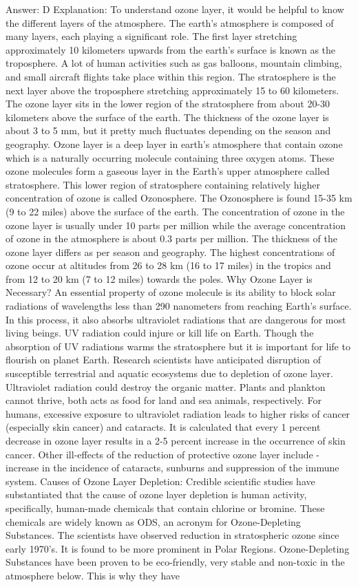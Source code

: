Answer: D
Explanation: To understand ozone layer, it would be helpful to know the different layers of the atmosphere. The earth’s atmosphere is composed of many layers, each playing a significant role. The first layer stretching approximately 10 kilometers upwards from the earth’s surface is known as the troposphere. A lot of human activities such as gas balloons, mountain climbing, and small aircraft flights take place within this region. The stratosphere is the next layer above the troposphere stretching approximately 15 to 60 kilometers. The ozone layer sits in the lower region of the stratosphere from about 20-30 kilometers above the surface of the earth. The thickness of the ozone layer is about 3 to 5 mm, but it pretty much fluctuates depending on the season and geography. Ozone layer is a deep layer in earth’s atmosphere that contain ozone which is a naturally occurring molecule containing three oxygen atoms. These ozone molecules form a gaseous layer in the Earth’s upper atmosphere called stratosphere. This lower region of stratosphere containing relatively higher concentration of ozone is called Ozonosphere. The Ozonosphere is found 15-35 km (9 to 22 miles) above the surface of the earth. The concentration of ozone in the ozone layer is usually under 10 parts per million while the average concentration of ozone in the atmosphere is about 0.3 parts per million. The thickness of the ozone layer differs as per season and geography. The highest concentrations of ozone occur at altitudes from 26 to 28 km (16 to 17 miles) in the tropics and from 12 to 20 km (7 to 12 miles) towards the poles. Why Ozone Layer is Necessary? An essential property of ozone molecule is its ability to block solar radiations of wavelengths less than 290 nanometers from reaching Earth’s surface. In this process, it also absorbs ultraviolet radiations that are dangerous for most living beings. UV radiation could injure or kill life on Earth. Though the absorption of UV radiations warms the stratosphere but it is important for life to flourish on planet Earth. Research scientists have anticipated disruption of susceptible terrestrial and aquatic ecosystems due to depletion of ozone layer. Ultraviolet radiation could destroy the organic matter. Plants and plankton cannot thrive, both acts as food for land and sea animals, respectively. For humans, excessive exposure to ultraviolet radiation leads to higher risks of cancer (especially skin cancer) and cataracts. It is calculated that every 1 percent decrease in ozone layer results in a 2-5 percent increase in the occurrence of skin cancer. Other ill-effects of the reduction of protective ozone layer include - increase in the incidence of cataracts, sunburns and suppression of the immune system. Causes of Ozone Layer Depletion: Credible scientific studies have substantiated that the cause of ozone layer depletion is human activity, specifically, human-made chemicals that contain chlorine or bromine. These chemicals are widely known as ODS, an acronym for Ozone-Depleting Substances. The scientists have observed reduction in stratospheric ozone since early 1970’s. It is found to be more prominent in Polar Regions. Ozone-Depleting Substances have been proven to be eco-friendly, very stable and non-toxic in the atmosphere below. This is why they have 